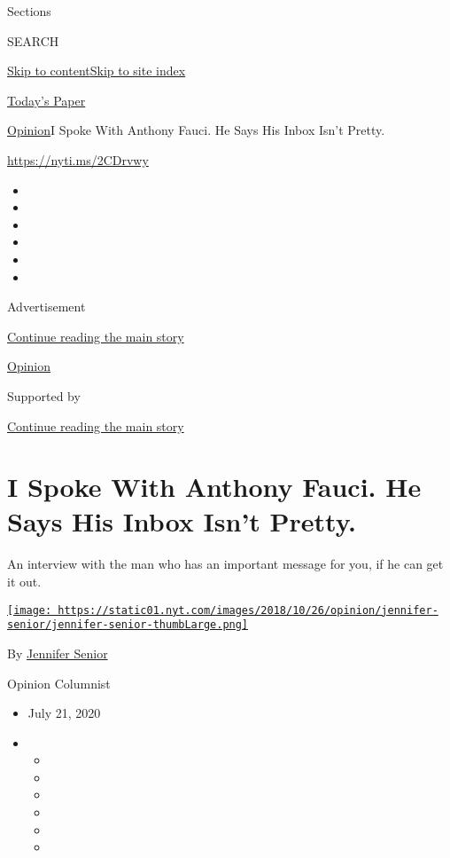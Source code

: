 Sections

SEARCH

\protect\hyperlink{site-content}{Skip to
content}\protect\hyperlink{site-index}{Skip to site index}

\href{https://myaccount.nytimes.com/auth/login?response_type=cookie\&client_id=vi}{}

\href{https://www.nytimes.com/section/todayspaper}{Today's Paper}

\href{/section/opinion}{Opinion}\textbar{}I Spoke With Anthony Fauci. He
Says His Inbox Isn't Pretty.

\href{https://nyti.ms/2CDrvwy}{https://nyti.ms/2CDrvwy}

\begin{itemize}
\item
\item
\item
\item
\item
\item
\end{itemize}

Advertisement

\protect\hyperlink{after-top}{Continue reading the main story}

\href{/section/opinion}{Opinion}

Supported by

\protect\hyperlink{after-sponsor}{Continue reading the main story}

\hypertarget{i-spoke-with-anthony-fauci-he-says-his-inbox-isnt-pretty}{%
\section{I Spoke With Anthony Fauci. He Says His Inbox Isn't
Pretty.}\label{i-spoke-with-anthony-fauci-he-says-his-inbox-isnt-pretty}}

An interview with the man who has an important message for you, if he
can get it out.

\href{https://www.nytimes.com/by/jennifer-senior}{\texttt{[image: https://static01.nyt.com/images/2018/10/26/opinion/jennifer-senior/jennifer-senior-thumbLarge.png]}}

By \href{https://www.nytimes.com/by/jennifer-senior}{Jennifer Senior}

Opinion Columnist

\begin{itemize}
\item
  July 21, 2020
\item
  \begin{itemize}
  \item
  \item
  \item
  \item
  \item
  \item
  \end{itemize}
\end{itemize}

